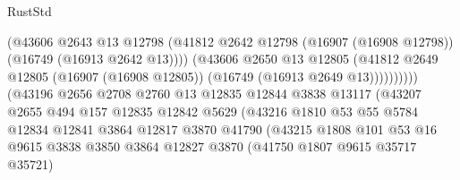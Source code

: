 \begin{lexlean}{RustStd}
\begin{coremodule}
                                          (@43606
                                            @2643
                                            @13
                                            @12798
                                            (@41812
                                              @2642
                                              @12798
                                              (@16907 (@16908 @12798))
                                              (@16749 (@16913 @2642 @13))))
                                          (@43606
                                            @2650
                                            @13
                                            @12805
                                            (@41812
                                              @2649
                                              @12805
                                              (@16907 (@16908 @12805))
                                              (@16749 (@16913 @2649 @13))))))))))
                              (@43196
                                @2656
                                @2708
                                @2760
                                @13
                                @12835
                                @12844
                                @3838
                                @13117
                                (@43207
                                  @2655
                                  @494
                                  @157
                                  @12835
                                  @12842
                                  @5629
                                  (@43216
                                    @1810
                                    @53
                                    @55
                                    @5784
                                    @12834
                                    @12841
                                    @3864
                                    @12817
                                    @3870
                                    @41790
                                    (@43215
                                      @1808
                                      @101
                                      @53
                                      @16
                                      @9615
                                      @3838
                                      @3850
                                      @3864
                                      @12827
                                      @3870
                                      (@41750 @1807 @9615 @35717 @35721)

\end{coremodule}
\end{lexlean}
